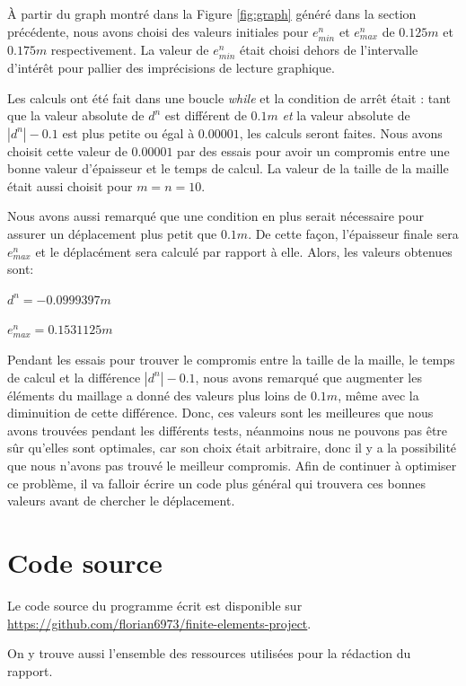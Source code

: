 \documentclass{article}
\begin{document}
   À partir du graph montré dans la Figure \ref{fig:graph} généré dans la section précédente, 
   nous avons choisi des valeurs initiales pour $e^n_{min}$ et $e^n_{max}$ de $0.125 m$ et $0.175 m$ respectivement.
    La valeur de $e^n_{min}$ était choisi dehors de l'intervalle d'intérêt pour pallier des imprécisions de lecture graphique.
   
   Les calculs ont été fait dans une boucle \emph{while} et la condition de arrêt était : tant que la valeur absolute de $d^n$ est différent de $0.1 m$ \emph{et} la valeur absolute de $|d^n|-0.1$ est plus petite ou égal à $0.00001$, les calculs seront faites. Nous avons choisit cette valeur de $0.00001$ par des essais pour avoir un compromis entre une bonne valeur d'épaisseur et le temps de calcul. La valeur de la taille de la maille était aussi choisit pour $m = n = 10$.
    
    Nous avons aussi remarqué que une condition en plus serait nécessaire pour assurer un déplacement plus petit que $ 0.1 m$. De cette façon, l'épaisseur finale sera $e^n_{max}$ et le déplacément sera calculé par rapport à elle. Alors, les valeurs obtenues sont:

    \begin{center}
    $d^n = - 0.0999397 m$
    
    $e^n_{max} = 0.1531125 m$
    \end{center}
    
    Pendant les essais pour trouver le compromis entre la taille de la maille, le temps de calcul et la différence $|d^n|-0.1$, nous avons remarqué que augmenter les éléments du maillage a donné des valeurs plus loins de $0.1 m$, même avec la diminuition de cette différence. Donc, ces valeurs sont les meilleures que nous avons trouvées pendant les différents tests, néanmoins nous ne pouvons pas être sûr qu'elles sont optimales, car son choix était arbitraire, donc il y a la possibilité que nous n'avons pas trouvé le meilleur compromis. Afin de continuer à optimiser ce problème, il va falloir écrire un code plus général qui trouvera ces bonnes valeurs avant de chercher le déplacement. 
    \clearpage
    \appendix
    \section {Code source}

    Le code source du programme écrit est disponible sur \url{https://github.com/florian6973/finite-elements-project}.

    On y trouve aussi l'ensemble des ressources utilisées pour la rédaction du rapport.



    
\end{document}

